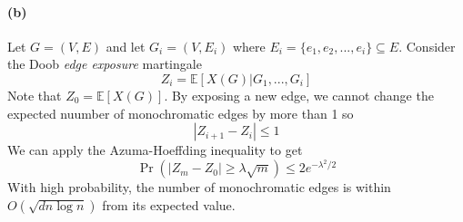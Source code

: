 \documentclass[11pt]{article} %
\begin{document}
\paragraph{(b)}
Let $G=(V,E)$ and let $G_i=(V,E_i)$ where $E_i=\{e_1,e_2,...,e_i\}\subseteq E$.
Consider the Doob \textit{edge exposure} martingale 
\[Z_i = \mathbb{E}[X(G)|G_1,...,G_i]\]
Note that $Z_0=\mathbb{E}[X(G)]$.
By exposing a new edge, we cannot change the expected nuumber of monochromatic edges by more than 1 so
\[|Z_{i+1}-Z_i|\leq 1\]
We can apply the Azuma-Hoeffding inequality to get 
\[\Pr(|Z_m-Z_0|\geq \lambda \sqrt{m})\leq 2e^{-\lambda^2/2}\]
With high probability, the number of monochromatic edges is within $O(\sqrt{dn\log n})$ from its expected value.
\end{document}
